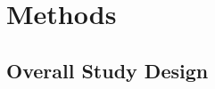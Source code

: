 \documentclass[12pt]{article}
\begin{document}
%


\section{Methods}\label{sec:method}
\subsection{Overall Study Design}\label{sec:overall study design}
\end{document}
